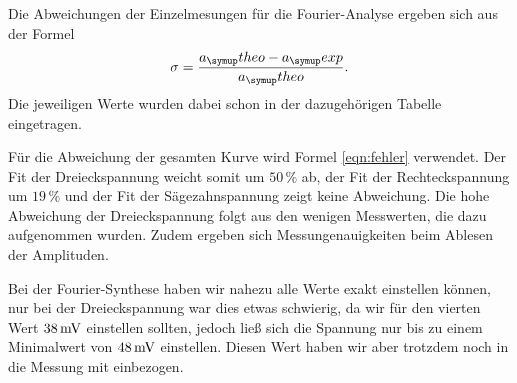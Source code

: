Die Abweichungen der Einzelmesungen für die Fourier-Analyse ergeben sich aus der Formel
\begin{equation}
  \sigma = \frac{a_\su{theo}-a_\su{exp}}{a_\su{theo}}.
\end{equation}
Die jeweiligen Werte wurden dabei schon in der dazugehörigen Tabelle eingetragen.

Für die Abweichung der gesamten Kurve wird Formel \eqref{eqn:fehler} verwendet.
Der Fit der Dreieckspannung weicht somit um $50\,\%$ ab, der Fit der Rechteckspannung
um $19\,\%$ und der Fit der Sägezahnspannung zeigt keine Abweichung. Die hohe Abweichung
der Dreieckspannung folgt aus den wenigen Messwerten, die dazu aufgenommen wurden.
Zudem ergeben sich Messungenauigkeiten beim Ablesen der Amplituden.

\noindent Bei der Fourier-Synthese haben wir nahezu alle Werte exakt einstellen können,
nur bei der Dreieckspannung war dies etwas schwierig, da wir für den vierten Wert $38 \,\si{\milli\volt}$
einstellen sollten, jedoch ließ sich die Spannung nur bis zu einem Minimalwert von $48 \,\si{\milli\volt}$
einstellen. Diesen Wert haben wir aber trotzdem noch in die Messung mit einbezogen.
